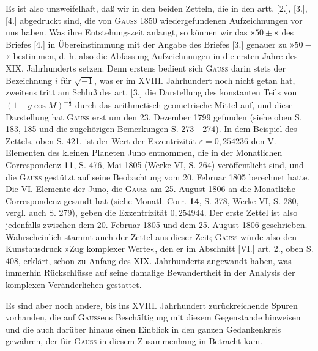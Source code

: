 \indent Es ist also unzweifelhaft, daß wir in den beiden Zetteln, die in den artt. [2.], [3.], [4.] abgedruckt sind, die von \textsc{Gauss} 1850 wiedergefundenen Aufzeichnungen vor uns haben. Was ihre Entstehungszeit anlangt, so können wir das »\(50\pm\)« des Briefes [4.] in Übereinstimmung mit der Angabe des Briefes [3.] genauer zu »\(50-\)« bestimmen, d. h. also die Abfassung  Aufzeichnungen in die ersten Jahre des XIX. Jahrhunderts setzen. Denn erstens bedient sich \textsc{Gauss} darin stets der Bezeichnung \(i\) für \(\sqrt{-1}\), was er im XVIII. Jahrhundert noch nicht getan hat, zweitens tritt am Schluß des art. [3.] die Darstellung des konstanten Teils von \((1-g\cos M)^{-\frac12}\) durch das arithmetisch-geometrische Mittel auf, und diese Darstellung hat \textsc{Gauss} erst um den 23. Dezember 1799 gefunden (siehe oben S. 183, 185 und die zugehörigen Bemerkungen S. 273—274). In dem Beispiel des  Zettels, oben S. 421, ist der Wert der Exzentrizität \(\varepsilon=0{,}254236\) den V. Elementen des kleinen Planeten Juno entnommen, die in der Monatlichen Correspondenz \textbf{11}, S. 476, Mai 1805 (Werke VI, S. 264) veröffentlicht sind, und die \textsc{Gauss} gestützt auf seine Beobachtung vom 20. Februar 1805 berechnet hatte. Die VI. Elemente der Juno, die \textsc{Gauss} am 25. August 1806 an die Monatliche Correspondenz gesandt hat (siehe Monatl. Corr. \textbf{14}, S. 378, Werke VI, S. 280, vergl. auch S. 279), geben die Exzentrizität \(0{,}254944\). Der erste Zettel ist also jedenfalls zwischen dem 20. Februar 1805 und dem 25. August 1806 geschrieben. Wahrscheinlich stammt auch der  Zettel aus dieser Zeit; \textsc{Gauss} würde also den Kunstausdruck »Zug komplexer Werte«, den er im Abschnitt [VI.] art. 2., oben S. 408, erklärt, schon zu Anfang des XIX. Jahrhunderts angewandt haben, was immerhin Rückschlüsse auf seine damalige Bewandertheit in der Analysis der komplexen Veränderlichen gestattet.

\indent Es sind aber noch andere, bis ins XVIII. Jahrhundert zurückreichende Spuren vorhanden, die auf \textsc{Gauss}ens Beschäftigung mit diesem Gegenstande hinweisen und die auch darüber hinaus einen Einblick in den ganzen Gedankenkreis gewähren, der für \textsc{Gauss} in diesem Zusammenhang in Betracht kam.

